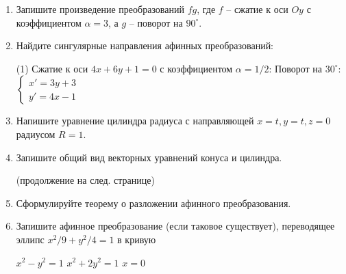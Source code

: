 \begin{enumerate}
\item Запишите произведение преобразований $fg$, где $f$ -- сжатие к оси $Oy$ с коэффициентом $\alpha = 3$, а $g$ -- поворот на $90^\circ$.
\vspace{3cm}
\item Найдите сингулярные направления афинных преобразований:
\begin{tasks}[after-item-skip=2cm](1)
\task Сжатие к оси $4x+6y+1=0$ с коэффициентом $\alpha=1/2$:
\task Поворот на $30^\circ$:
\task $\begin{cases}
	x' = 3y+3\\
	y' = 4x - 1
\end{cases}$
\end{tasks}
\vspace{2cm}

\item Напишите уравнение цилиндра радиуса с направляющей ${x=t, y=t, z=0}$ радиусом $R=1$.
\vspace{3cm}
\item Запишите общий вид векторных уравнений конуса и цилиндра.
\vspace{3cm}

(продолжение на след. странице)

\item Сформулируйте теорему  о разложении афинного преобразования.
\vspace{3cm}
\item Запишите афинное преобразование (если таковое существует), переводящее эллипс $x^2/9 + y^2/4 = 1$ в кривую
\begin{tasks}
\task $x^2 - y^2 = 1$
\task $x^2 + 2y^2 = 1$
\task $x = 0$
\end{tasks}

\end{enumerate}